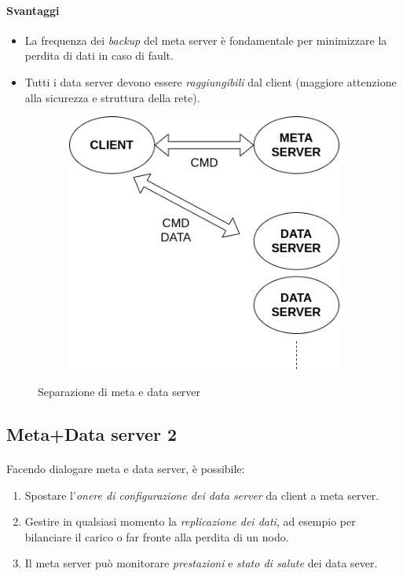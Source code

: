\documentclass[11pt,a4paper,english]{article}
\begin{document}
\paragraph{Svantaggi} \begin{itemize}
	\item La frequenza dei \emph{backup} del meta server è fondamentale per minimizzare la perdita di dati in caso di fault.
	\item Tutti i data server devono essere \emph{raggiungibili} dal client (maggiore attenzione alla sicurezza e struttura della rete).
\end{itemize}

\begin{figure}[H]
	\centering
	\begin{subfigure}{0.60\linewidth}
		\includegraphics[width=\linewidth]{../diagrams/architettura/5.png}
	\end{subfigure}
	\caption{Separazione di meta e data server}
\end{figure}



\subsection{Meta+Data server 2}

\paragraph{} Facendo dialogare meta e data server, è possibile:\begin{enumerate}
	\item Spostare l'\emph{onere di configurazione dei data server} da client a meta server.
	\item Gestire in qualsiasi momento la \emph{replicazione dei dati}, ad esempio per bilanciare il carico o far fronte alla perdita di un nodo.
	\item Il meta server può monitorare \emph{prestazioni} e \emph{stato di salute} dei data sever.
\end{enumerate}
\end{document}

